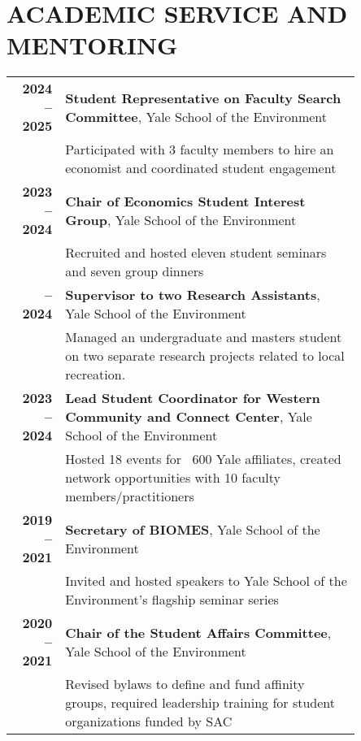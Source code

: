\documentclass[11pt]{article}
\begin{document}
\section*{ACADEMIC SERVICE AND MENTORING}
\begin{longtable}{>{\bfseries}r p{0.85\linewidth}} %
2024 – 2025 & \textbf{Student Representative on Faculty Search Committee}, Yale School of the Environment \\
    & Participated with 3 faculty members to hire an economist and coordinated student engagement \\[1ex]
2023 – 2024 & \textbf{Chair of Economics Student Interest Group}, Yale School of the Environment \\
    & Recruited and hosted eleven student seminars and seven group dinners \\[1ex]
\clearpage
2023 – 2024 & \textbf{Supervisor to two Research Assistants}, Yale School of the Environment \\
    & Managed an undergraduate and masters student on two separate research projects related to local recreation.\\
2023 – 2024 & \textbf{Lead Student Coordinator for Western Community and Connect Center}, Yale School of the Environment \\
    & Hosted 18 events for ~600 Yale affiliates, created network opportunities with 10 faculty members/practitioners \\[1ex]
2019 – 2021 & \textbf{Secretary of BIOMES}, Yale School of the Environment \\
    & Invited and hosted speakers to Yale School of the Environment’s flagship seminar series \\[1ex]
2020 – 2021 & \textbf{Chair of the Student Affairs Committee}, Yale School of the Environment \\
    & Revised bylaws to define and fund affinity groups, required leadership training for student organizations funded by SAC \\[1ex]
\end{longtable}
\end{document}
